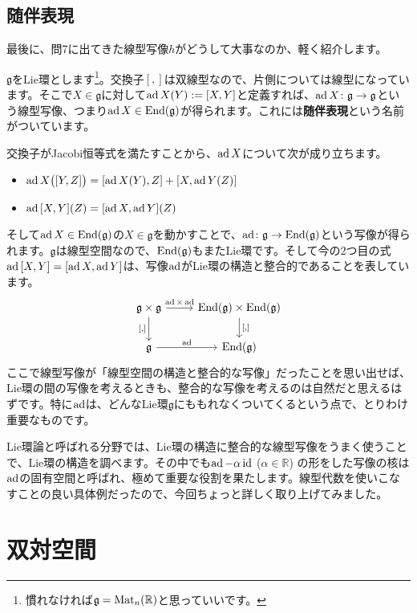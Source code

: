 \subsection{随伴表現}
最後に、問7に出てきた線型写像$h$がどうして大事なのか、軽く紹介します。

$\mathfrak{g}$をLie環とします\footnote{慣れなければ$\mathfrak{g} = \operatorname{Mat}_n(\mathbb{R})$と思っていいです。}。交換子$[, ]$は双線型なので、片側については線型になっています。そこで$X \in \mathfrak{g}$に対して$\operatorname{ad} X(Y) := [X, Y]$と定義すれば、$\operatorname{ad} X \colon \mathfrak{g} \rightarrow \mathfrak{g}$という線型写像、つまり$\operatorname{ad} X \in \operatorname{End}(\mathfrak{g})$が得られます。これには\textbf{随伴表現}という名前がついています。

交換子がJacobi恒等式を満たすことから、$\operatorname{ad} X$について次が成り立ちます。
\begin{itemize}
\item $\operatorname{ad} X\bigl([Y, Z]\bigr) = [\operatorname{ad} X(Y), Z] + [X, \operatorname{ad} Y(Z)]$
\item $\operatorname{ad} {[X, Y]} (Z) = [\operatorname{ad} X, \operatorname{ad} Y] (Z)$
\end{itemize}
そして$\operatorname{ad} X \in \operatorname{End}(\mathfrak{g})$の$X \in \mathfrak{g}$を動かすことで、$\operatorname{ad}\colon \mathfrak{g} \rightarrow \operatorname{End}(\mathfrak{g})$という写像が得られます。$\mathfrak{g}$は線型空間なので、$\operatorname{End}(\mathfrak{g})$もまたLie環です。そして今の$2$つ目の式$\operatorname{ad} {[X, Y]} = [\operatorname{ad} X, \operatorname{ad} Y]$は、写像$\operatorname{ad}$がLie環の構造と整合的であることを表しています。
\[
\begin{tikzcd}
\mathfrak{g} \times \mathfrak{g} \arrow{r}{\ad\times\ad} \arrow{d}[swap]{[,]} & \End(\mathfrak{g}) \times \End(\mathfrak{g}) \arrow{d}{[,]} \\
\mathfrak{g} \arrow{r}{\ad} & \End(\mathfrak{g})
\end{tikzcd}
\]
ここで線型写像が「線型空間の構造と整合的な写像」だったことを思い出せば、Lie環の間の写像を考えるときも、整合的な写像を考えるのは自然だと思えるはずです。特に$\operatorname{ad}$は、どんなLie環$\mathfrak{g}$にももれなくついてくるという点で、とりわけ重要なものです。

Lie環論と呼ばれる分野では、Lie環の構造に整合的な線型写像をうまく使うことで、Lie環の構造を調べます。その中でも$\operatorname{ad} - \alpha \operatorname{id}$ ($\alpha \in \mathbb{R}$) の形をした写像の核は$\operatorname{ad}$の固有空間と呼ばれ、極めて重要な役割を果たします。線型代数を使いこなすことの良い具体例だったので、今回ちょっと詳しく取り上げてみました。

\section{双対空間}

